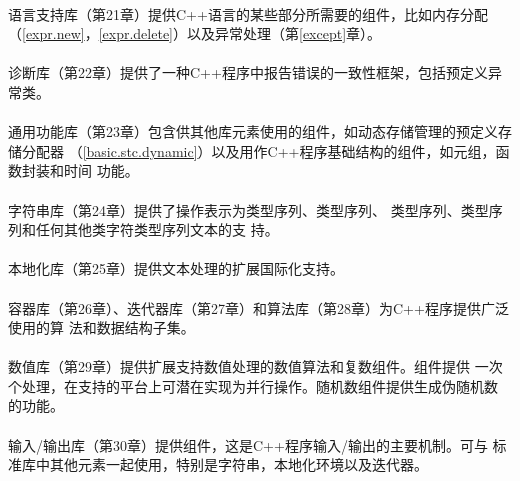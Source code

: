 \paragraph{}
语言支持库（第21章）提供C++语言的某些部分所需要的组件，比如内存分配
（\ref{expr.new}，\ref{expr.delete}）以及异常处理（第\ref{except}章）。

\paragraph{}
诊断库（第22章）提供了一种C++程序中报告错误的一致性框架，包括预定义异常类。

\paragraph{}
通用功能库（第23章）包含供其他库元素使用的组件，如动态存储管理的预定义存储分配器
（\ref{basic.stc.dynamic}）以及用作C++程序基础结构的组件，如元组，函数封装和时间
功能。

\paragraph{}
字符串库（第24章）提供了操作表示为类型序列、类型序列、
类型序列、类型序列和任何其他类字符类型序列文本的支
持。

\paragraph{}
本地化库（第25章）提供文本处理的扩展国际化支持。

\paragraph{}
容器库（第26章）、迭代器库（第27章）和算法库（第28章）为C++程序提供广泛使用的算
法和数据结构子集。

\paragraph{}
数值库（第29章）提供扩展支持数值处理的数值算法和复数组件。组件提供
一次个处理，在支持的平台上可潜在实现为并行操作。随机数组件提供生成伪随机数
的功能。

\paragraph{}
输入/输出库（第30章）提供组件，这是C++程序输入/输出的主要机制。可与
标准库中其他元素一起使用，特别是字符串，本地化环境以及迭代器。

